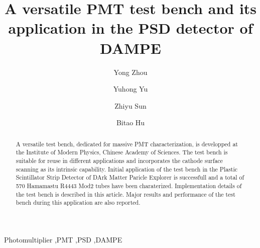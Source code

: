 \documentclass[5p, times]{elsarticle}
\begin{document}
\begin{frontmatter}

\title{A versatile PMT test bench and its application in the PSD detector of DAMPE}

\author[imp, lzu, ucas]{Yong Zhou}

\author[imp]{Yuhong Yu}

\author[imp]{Zhiyu Sun}

\author[lzu]{Bitao Hu}

\address[imp]{Institute of Modern Physicas, Chinese Academy of Sciences,  509 Nanchang Road,  Lanzhou,  730000,  P.R.China}
\address[lzu]{School of Nuclear Science and Technology,  Lanzhou University,  222 South Tianshui Road,  Lanzhou,  730000,  P.R.China}
\address[ucas]{Graduate University of the Chinese Academy of Sciences,  19A Yuquan Road,  Beijing,  100049,  P.R.China}

\begin{abstract}

A versatile test bench, dedicated for massive PMT characterization, is developped at the Institute of Modern Physics, Chinese Academy of Sciences.
The test bench is suitable for reuse in different applications and incorporates the cathode surface scanning as its intrinsic capability.
Initial application of the test bench in the Plastic Scintillator Strip Detector of DArk Matter Paricle Explorer is successfull and a total of 570 Hamamastu R4443 Mod2 tubes have been charaterized.
Implementation details of the test bench is described in this article.
Major results and performance of the test bench during this application are also reported. 
\end{abstract}

\begin{keyword}
Photomultiplier
\sep PMT
\sep PSD
\sep DAMPE



\end{keyword}

\end{frontmatter}
\end{document}
